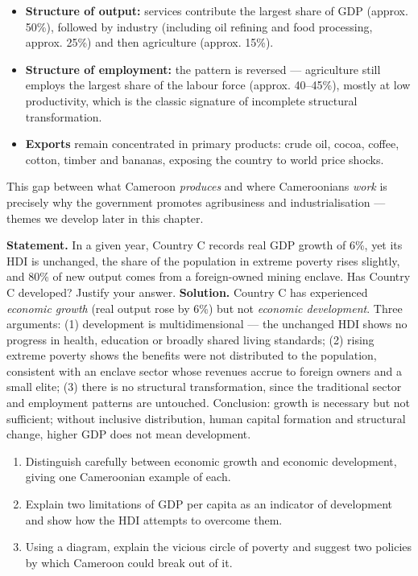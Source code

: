 \documentclass[11pt]{article}
\begin{document}
\begin{itemize}
\item \textbf{Structure of output:} services contribute the largest share of GDP (approx. 50\%), followed by industry (including oil refining and food processing, approx. 25\%) and then agriculture (approx. 15\%).
\item \textbf{Structure of employment:} the pattern is reversed — agriculture still employs the largest share of the labour force (approx. 40--45\%), mostly at low productivity, which is the classic signature of incomplete structural transformation.
\item \textbf{Exports} remain concentrated in primary products: crude oil, cocoa, coffee, cotton, timber and bananas, exposing the country to world price shocks.
\end{itemize}

This gap between what Cameroon \emph{produces} and where Cameroonians \emph{work} is precisely why the government promotes agribusiness and industrialisation — themes we develop later in this chapter.

\begin{exoresolu}
\textbf{Statement.} In a given year, Country C records real GDP growth of 6\%, yet its HDI is unchanged, the share of the population in extreme poverty rises slightly, and 80\% of new output comes from a foreign-owned mining enclave. Has Country C developed? Justify your answer.
\tcblower
\textbf{Solution.} Country C has experienced \emph{economic growth} (real output rose by 6\%) but not \emph{economic development}. Three arguments: (1) development is multidimensional — the unchanged HDI shows no progress in health, education or broadly shared living standards; (2) rising extreme poverty shows the benefits were not distributed to the population, consistent with an enclave sector whose revenues accrue to foreign owners and a small elite; (3) there is no structural transformation, since the traditional sector and employment patterns are untouched. Conclusion: growth is necessary but not sufficient; without inclusive distribution, human capital formation and structural change, higher GDP does not mean development.
\end{exoresolu}

\begin{exercice}
\begin{enumerate}
\item Distinguish carefully between economic growth and economic development, giving one Cameroonian example of each.
\item Explain two limitations of GDP per capita as an indicator of development and show how the HDI attempts to overcome them.
\item Using a diagram, explain the vicious circle of poverty and suggest two policies by which Cameroon could break out of it.
\end{enumerate}
\end{exercice}
\end{document}
